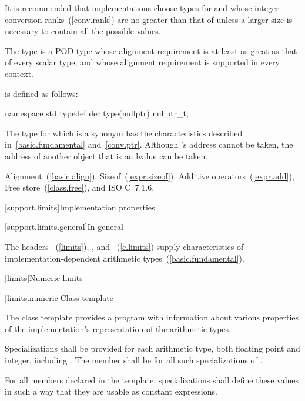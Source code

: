 \pnum
\enternote
It is recommended that implementations choose types for  and 
whose integer conversion ranks~(\ref{conv.rank}) are no greater than that of
 unless a larger size is necessary to contain all the possible values.
\exitnote

\pnum
The type
%
 is a POD type whose alignment requirement
is at least as great as that of every scalar type, and whose alignment
requirement is supported in every context.

\pnum
{}%
 is defined as follows:

\begin{codeblock}
namespace std {
  typedef decltype(nullptr) nullptr_t;
}
\end{codeblock}

The type for which  is a synonym has the characteristics
described in~\ref{basic.fundamental} and~\ref{conv.ptr}. \enternote Although
's address cannot be taken, the address of another
 object that is an lvalue can be taken. \exitnote

\xref Alignment~(\ref{basic.align}), Sizeof~(\ref{expr.sizeof}), Additive
operators~(\ref{expr.add}), Free store~(\ref{class.free}), and ISO C~7.1.6.

[support.limits]{Implementation properties}

[support.limits.general]{In general}

\pnum
The headers
~(\ref{limits}),
, and
~(\ref{c.limits})
supply characteristics of implementation-dependent
arithmetic types~(\ref{basic.fundamental}).

[limits]{Numeric limits}

[limits.numeric]{Class template }

\pnum
The
%
class template provides a \Cpp program with information about various properties of
the implementation's representation of the
arithmetic types.

\pnum
Specializations shall be provided for each
arithmetic type,
both floating point and integer, including
.
The member
shall be
for all such specializations of
.

\pnum
For all members declared
 
in the
template, specializations shall define these values in such a way
that they are usable as
constant expressions.

